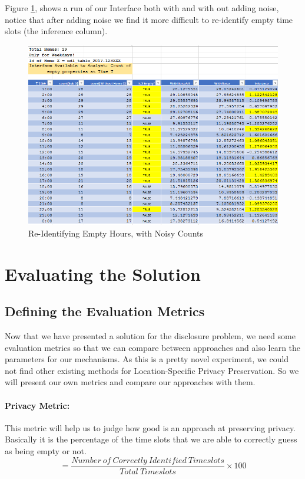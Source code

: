 \documentclass[12pt]{report}
\theoremstyle{named}
\begin{document}
Figure \ref{fig:NoisyCountReID}, shows a run of our Interface both with and with out adding noise, notice that after adding noise we find it more difficult to re-identify empty time slots (the inference column).

\begin{figure}[ht]
\centering
        \includegraphics[width=150mm,scale=1]{Images/NoisyCountReID.PNG}
    \caption{Re-Identifying Empty Hours, with Noisy Counts}
    \label{fig:NoisyCountReID}
\end{figure}


\section{Evaluating the Solution}
\subsection{Defining the Evaluation Metrics}
Now that we have presented a solution for the disclosure problem, we need some evaluation metrics so that we can compare between approaches and also learn the parameters for our mechanisms. As this is a pretty novel experiment, we could not find other existing methods for Location-Specific Privacy Preservation. So we will present our own metrics and compare our approaches with them.

\paragraph{\textbf{Privacy Metric:}} This metric will help us to judge how good is an approach at preserving privacy. Basically it is the percentage of the time slots that we are able to correctly guess as being empty or not.
\[=\frac{Number\ of\ Correctly\ Identified\ Timeslots}{Total\ Timeslots} \times 100\]
\end{document}
